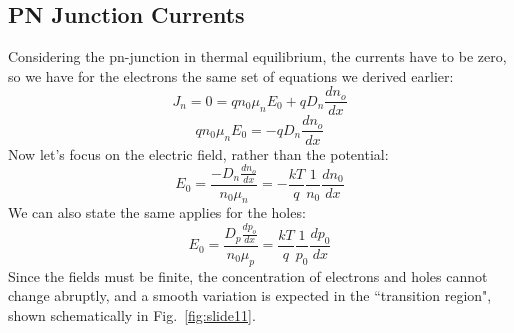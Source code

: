 \subsection{PN Junction Currents}
Considering the pn-junction in thermal equilibrium,  the currents have to be zero, so we have for the electrons the same set of equations we derived earlier:
    \begin{equation} 
        {J_n} = 0 = q{n_0}{\mu _n}{E_0} + q{D_n}\frac{{d{n_o}}}{{dx}}
    \end{equation}
    \begin{equation} 
        q{n_0}{\mu _n}{E_0} =  - q{D_n}\frac{{d{n_o}}}{{dx}} 
    \end{equation}
Now let's focus on the electric field, rather than the potential:
    \begin{equation} 
        {E_0} = \frac{{ - {D_n}\frac{{d{n_o}}}{{dx}}}}{{{n_0}{\mu _n}}} =  - \frac{{kT}}{q}\frac{1}{{{n_0}}}\frac{{d{n_0}}}{{dx}} 
    \end{equation}
We can also state the same applies for the holes:
    \begin{equation} 
        {E_0} = \frac{{{D_p}\frac{{d{p_o}}}{{dx}}}}{{{n_0}{\mu _p}}} = \frac{{kT}}{q}\frac{1}{{{p_0}}}\frac{{d{p_0}}}{{dx}} 
    \end{equation}
Since the fields must be finite, the concentration of electrons and holes cannot change abruptly, and a smooth variation is expected in the ``transition region", shown schematically in Fig.~\ref{fig:slide11}.
